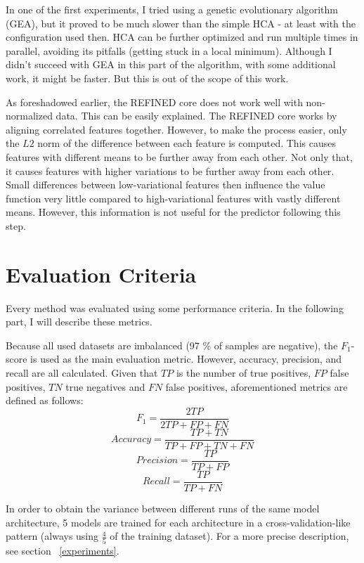 In one of the first experiments, I tried using a genetic evolutionary algorithm (\ac{GEA}), but it proved to be much slower than the simple HCA - at least with the configuration used then. HCA can be further optimized and run multiple times in parallel, avoiding its pitfalls (getting stuck in a local minimum). Although I didn't succeed with GEA in this part of the algorithm, with some additional work, it might be faster. But this is out of the scope of this work.

As foreshadowed earlier, the REFINED core does not work well with non-normalized data. This can be easily explained. The REFINED core works by aligning correlated features together. However, to make the process easier, only the $L2$ norm of the difference between each feature is computed. This causes features with different means to be further away from each other. Not only that, it causes features with higher variations to be further away from each other. Small differences between low-variational features then influence the value function very little compared to high-variational features with vastly different means. However, this information is not useful for the predictor following this step.

\section{Evaluation Criteria}

Every method was evaluated using some performance criteria. In the following part, I will describe these metrics.

Because all used datasets are imbalanced (97 \% of samples are negative), the $F_1$-score is used as the main evaluation metric. However, accuracy, precision, and recall are all calculated. Given that $TP$ is the number of true positives, $FP$ false positives, $TN$ true negatives and $FN$ false positives, aforementioned metrics are defined as follows:
$$F_1 = \frac{2TP}{2TP + FP + FN}$$
$$Accuracy = \frac{TP + TN}{TP + FP + TN + FN}$$
$$Precision = \frac{TP}{TP + FP}$$
$$Recall = \frac{TP}{TP + FN}$$

In order to obtain the variance between different runs of the same model architecture, 5 models are trained for each architecture in a cross-validation-like pattern (always using $\frac{4}{5}$ of the training dataset). For a more precise description, see section ~\ref{experiments}.